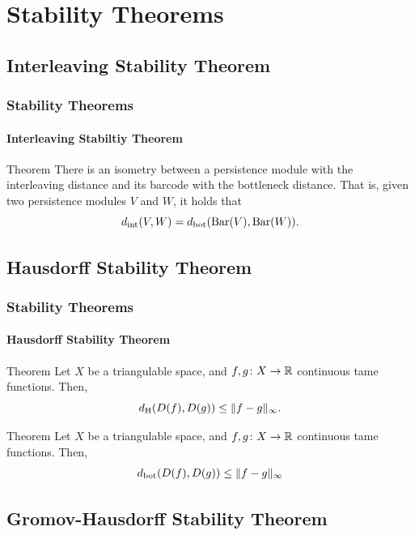 \documentclass[aspectratio=169]{beamer}
\begin{document}
\section{Stability Theorems}

\subsection{Interleaving Stability Theorem}

\begin{frame}
  \frametitle{Stability Theorems}
  \framesubtitle{Interleaving Stabiltiy Theorem}
  
  \begin{block}{Theorem}
    There is an isometry between a persistence module with the interleaving distance and its barcode with the bottleneck distance. That is, given two persistence modules $ V $ and $ W $, it holds that
    \begin{equation}
        d_{\operatorname{int}} (V, W) = d_{\operatorname{bot}} (\operatorname{Bar}(V), \operatorname{Bar}(W)).
    \end{equation} 
  \end{block}
\end{frame}

\subsection{Hausdorff Stability Theorem}

\begin{frame}
  \frametitle{Stability Theorems}
  \framesubtitle{Hausdorff Stability Theorem}

  \begin{block}{Theorem}
    Let $ X $ be a triangulable space, and $ f, g\colon X \to \mathbb R $ continuous tame functions. Then,
    \begin{equation}
        d_{\operatorname{H}}(D(f), D(g)) \leq \| f - g \|_\infty.
    \end{equation}
  \end{block}
  \pause
  \begin{block}{Theorem}
    Let $ X $ be a triangulable space, and $ f, g\colon X \to \mathbb R $ continuous tame functions. Then,
    \begin{align}
        d_{\operatorname{bot}} (D(f), D(g)) \leq \|f-g\|_\infty
    \end{align}
  \end{block}
\end{frame}

\subsection{Gromov-Hausdorff Stability Theorem}
\end{document}
